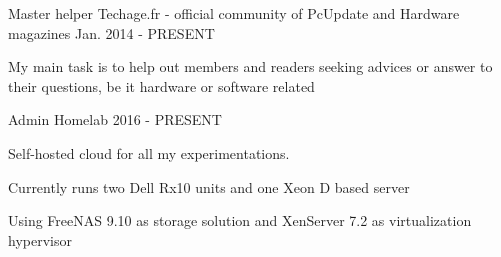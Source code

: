 

\begin{cventries}

  \cventry
    {Master helper} %
    {Techage.fr - official community of PcUpdate and Hardware magazines} %
    {} %
    {Jan. 2014 - PRESENT} %
    {
      \begin{cvitems} %
        \item {My main task is to help out members and readers seeking advices or answer to their questions, be it hardware or software related}
      \end{cvitems}
    }

  \cventry
    {Admin} %
    {Homelab} %
    {} %
    {2016 - PRESENT} %
    {
      \begin{cvitems} %
        \item {Self-hosted cloud for all my experimentations.}
        \item {Currently runs two Dell Rx10 units and one Xeon D based server}
        \item {Using FreeNAS 9.10 as storage solution and XenServer 7.2 as virtualization hypervisor}
      \end{cvitems}
    }

\end{cventries}
